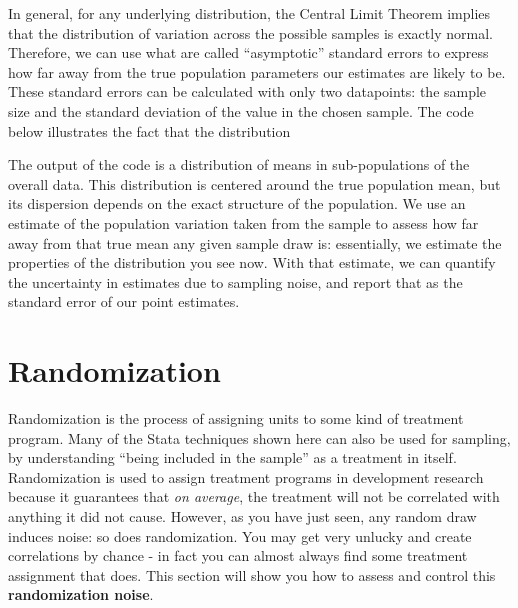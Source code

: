 In general, for any underlying distribution, the Central Limit Theorem implies that
the distribution of variation across the possible samples is exactly normal.
Therefore, we can use what are called ``asymptotic'' standard errors
to express how far away from the true population parameters our estimates are likely to be.
These standard errors can be calculated with only two datapoints:
the sample size and the standard deviation of the value in the chosen sample.
The code below illustrates the fact that the distribution


{
}

The output of the code is a distribution of means in sub-populations of the overall data.
This distribution is centered around the true population mean,
but its dispersion depends on the exact structure of the population.
We use an estimate of the population variation taken from the sample
to assess how far away from that true mean any given sample draw is:
essentially, we estimate the properties of the distribution you see now.
With that estimate, we can quantify the uncertainty in estimates due to sampling noise,
and report that as the standard error of our point estimates.

\section{Randomization}

Randomization is the process of assigning units to some kind of treatment program.
Many of the Stata techniques shown here can also be used for sampling,
by understanding ``being included in the sample'' as a treatment in itself.
Randomization is used to assign treatment programs in development research
because it guarantees that \textit{on average},
the treatment will not be correlated with anything it did not cause.\cite{duflo2007using}
However, as you have just seen, any random draw induces noise: so does randomization.
You may get very unlucky and create correlations by chance -
in fact you can almost always find some treatment assignment that does.
This section will show you how to assess and control this \textbf{randomization noise}.

